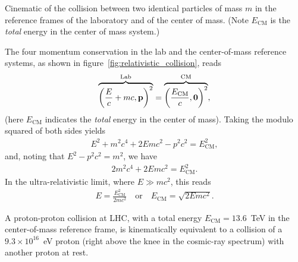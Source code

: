 \begin{marginfigure}
  \caption{Cinematic of the collision between two identical particles of mass $m$
    in the reference frames of the laboratory and of the center of mass. (Note
    $E_\text{CM}$ is the \emph{total} energy in the center of mass system.)}
  \label{fig:relativistic_collision}
\end{marginfigure}

The four momentum conservation in the lab and the center-of-mass reference
systems, as shown in figure~\ref{fig:relativistic_collision}, reads
\begin{align*}
  \overbrace{\left(\frac{E}{c} + mc, \vb{p}\right)^2}^\text{Lab} =
  \overbrace{\left(\frac{E_\text{CM}}{c}, \vb{0}\right)^2}^\text{CM},
\end{align*}
(here $E_\text{CM}$ indicates the \emph{total} energy in the center of mass).
Taking the modulo squared of both sides yields
\begin{align*}
  E^2 + m^2c^4 + 2Emc^2 - p^2c^2 = E_\text{CM}^2,
\end{align*}
and, noting that $E^2 - p^2c^2 = m^2$, we have
\begin{align*}
  2m^2c^4 + 2Emc^2 = E_\text{CM}^2.
\end{align*}
In the ultra-relativistic limit, where $E \gg mc^2$, this reads
\begin{align}
  E = \frac{E_\text{CM}^2}{2mc^2}
  \quad\text{or}\quad
  E_\text{CM} = \sqrt{2Emc^2}.
\end{align}

A proton-proton collision at LHC, with a total energy $E_\text{CM} = 13.6$~TeV in the
center-of-mass reference frame, is kinematically equivalent to a collision
of a $9.3 \times 10^{16}$~eV proton (right above the knee in the cosmic-ray spectrum)
with another proton at rest.
